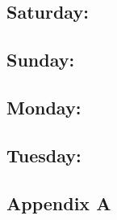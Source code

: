 \documentclass[12pt,oneside]{book}
\begin{document}
  \subsection*{Saturday:}

  \subsection*{Sunday:}

  \subsection*{Monday:}


  \subsection*{Tuesday:}

\subsection*{Appendix A}
\end{document}
